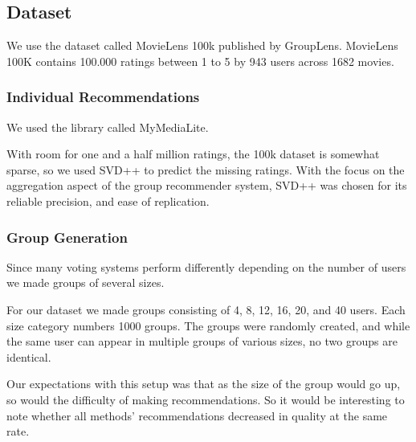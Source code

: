 \subsection{Dataset}\label{sec:dataset}
We use the dataset called MovieLens 100k published by GroupLens\cite{movielens100k}. MovieLens 100K contains 100.000 ratings between 1 to 5 by 943 users across 1682 movies.

\subsubsection{Individual Recommendations}
We used the library called MyMediaLite\cite{mymedialite}.

With room for one and a half million ratings, the 100k dataset is somewhat sparse, so we used SVD++  to predict the missing ratings. With the focus on the aggregation aspect of the group recommender system, SVD++ was chosen for its reliable precision, and ease of replication.

\subsubsection{Group Generation}
Since many voting systems perform differently depending on the number of users we made groups of several sizes.

For our dataset we made groups consisting of 4, 8, 12, 16, 20, and 40 users. Each size category numbers 1000 groups. The groups were randomly created, and while the same user can appear in multiple groups of various sizes, no two groups are identical.

Our expectations with this setup was that as the size of the group would go up, so would the difficulty of making recommendations. So it would be interesting to note whether all methods' recommendations decreased in quality at the same rate.

